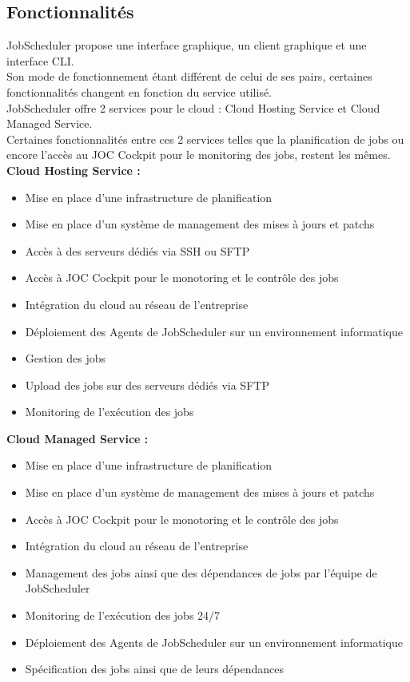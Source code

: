 \documentclass[12pt]{article}
\begin{document}
\subsection{Fonctionnalités}
JobScheduler propose une interface graphique, un client graphique et une interface CLI.
\\
Son mode de fonctionnement étant différent de celui de ses pairs, certaines fonctionnalités changent en fonction du service utilisé.
\\
JobScheduler offre 2 services pour le cloud : Cloud Hosting Service et Cloud Managed Service.
\\
Certaines fonctionnalités entre ces 2 services telles que la planification de jobs ou encore l'accès au JOC Cockpit pour le monitoring des jobs, restent les mêmes.
\\
\textbf{Cloud Hosting Service :}
\begin{itemize}
    \item Mise en place d'une infrastructure de planification
    \item Mise en place d'un système de management des mises à jours et patchs
    \item Accès à des serveurs dédiés via SSH ou SFTP
    \item Accès à JOC Cockpit pour le monotoring et le contrôle des jobs
    \item Intégration du cloud au réseau de l'entreprise
    \item Déploiement des Agents de JobScheduler sur un environnement informatique
    \item Gestion des jobs
    \item Upload des jobs sur des serveurs dédiés via SFTP
    \item Monitoring de l'exécution des jobs
\end{itemize}

\vspace{0.5cm}

\textbf{Cloud Managed Service :}
\begin{itemize}
    \item Mise en place d'une infrastructure de planification
    \item Mise en place d'un système de management des mises à jours et patchs
    \item Accès à JOC Cockpit pour le monotoring et le contrôle des jobs
    \item Intégration du cloud au réseau de l'entreprise
    \item Management des jobs ainsi que des dépendances de jobs par l'équipe de JobScheduler
    \item Monitoring de l'exécution des jobs 24/7
    \item Déploiement des Agents de JobScheduler sur un environnement informatique
    \item Spécification des jobs ainsi que de leurs dépendances
\end{itemize}
\end{document}
